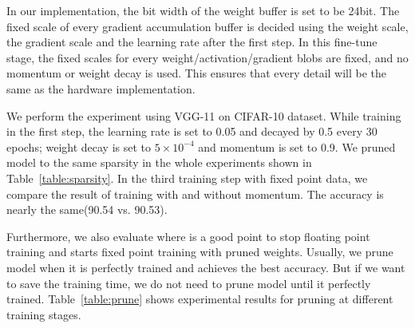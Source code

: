 In our implementation, the bit width of the weight buffer is set to be 24bit. The fixed scale of every gradient accumulation buffer is decided using the weight scale, the gradient scale and the learning rate after the first step. In this fine-tune stage, the fixed scales for every weight/activation/gradient blobs are fixed, and no momentum or weight decay is used. This ensures that every detail will be the same as the hardware implementation.

We perform the experiment using VGG-11\cite{Simonyan2014Very} on CIFAR-10\cite{krizhevsky2009learning} dataset. While training in the first step, the learning rate is set to 0.05 and decayed by 0.5 every 30 epochs; weight decay is set to $5 \times 10^{-4}$ and momentum is set to 0.9. We pruned model to the same sparsity in the whole experiments shown in Table~\ref{table:sparsity}. In the third training step with fixed point data, we compare the result of training with and without momentum. The accuracy is nearly the same(90.54 vs. 90.53). 

Furthermore, we also evaluate where is a good point to stop floating point training and starts fixed point training with pruned weights. Usually, we prune model when it is perfectly trained and achieves the best accuracy. But if we want to save the training time, we do not need to prune model until it perfectly trained. Table~\ref{table:prune} shows experimental results for pruning at different training stages. 


